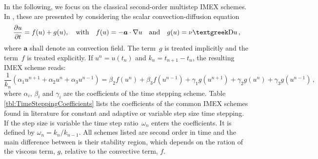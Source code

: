 In the following, we focus on the classical second-order multistep IMEX schemes. In \cite{Ascher1995}, these are presented by considering the scalar convection-diffusion equation
\begin{equation}
	\pd{u}{t}=f(u)+g(u),\quad\text{with}\quad
	f(u)=-\bm{a}\cdot\nabla u\quad\text{and}\quad
	g(u)=\nu\laplace u\,,
\end{equation}
where $\bm{a}$ shall denote an convection field. The term~$g$ is treated implicitly and the term~$f$ is treated explicitly. If $u^n=u(t_n)$ and $k_n=t_{n+1}-t_n$, the resulting IMEX scheme reads:
\begin{equation}
	\frac{1}{k_n}\left(\alpha_1 u^{n+1}+ \alpha_2 u^{n}+\alpha_3 u^{n-1}\right)=\beta_2 f(u^n) + \beta_3 f(u^{n-1})+\gamma_1 g(u^{n+1}) +\gamma_2 g(u^n)+\gamma_3 g(u^{n-1})\,,
\end{equation}
where $\alpha_i$, $\beta_i$ and $\gamma_i$ are the coefficients of the time stepping scheme. Table\,\ref{tbl:TimeSteppingCoefficients} lists the coefficients of the common IMEX schemes found in literature for constant and adaptive or variable step size time stepping. If the step size is variable the time step ratio~$\omega_n$ enters the coefficients. It is defined by $\omega_n=k_n/k_{n-1}$. All schemes listed are second order in time and the main difference between is their stability region, which depends on the ration of the viscous term, $g$, relative to the convective term, $f$.
